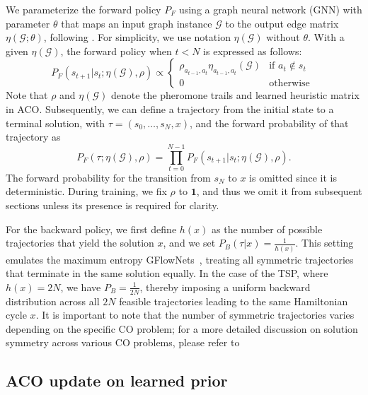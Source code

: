 \documentclass[twoside]{article}
\theoremstyle{plain}
\theoremstyle{definition}
\theoremstyle{remark}
\begin{document}
We parameterize the forward policy $P_F$ using a graph neural network (GNN) with parameter $\theta$ that maps an input graph instance $\mathcal{G}$ to the output edge matrix $\eta(\mathcal{G};\theta)$, following \citet{ye2023deepaco}. For simplicity, we use notation $\eta(\mathcal{G})$ without $\theta$. With a given $\eta(\mathcal{G})$, the forward policy when $t < N$ is expressed as follows:
\begin{equation} \label{eq:policy}
    P_F(s_{t+1}|s_t; \eta(\mathcal{G}), \rho)
    \propto \begin{cases} \rho_{a_{t-1},a_{t}}\eta_{a_{t-1},a_{t}}(\mathcal{G}) & \text{if $a_t \notin s_{t}$ }\\ 0 & \text{otherwise} \end{cases}
\end{equation}
Note that $\rho$ and $\eta(\mathcal{G})$ denote the pheromone trails and learned heuristic matrix in ACO. Subsequently, we can define a trajectory from the initial state to a terminal solution, with $\tau = (s_0, \ldots, s_N, x)$, and the forward probability of that trajectory as
\begin{equation} \label{eq:forward_traj}
    P_F(\tau;\eta(\mathcal{G}), \rho) = \prod_{t=0}^{N-1} P_F(s_{t+1}|s_t; \eta(\mathcal{G}), \rho).
\end{equation}
The forward probability for the transition from $s_N$ to $x$ is omitted since it is deterministic. During training, we fix $\rho$ to $\mathbf{1}$, and thus we omit it from subsequent sections unless its presence is required for clarity.


For the backward policy, we first define $h(x)$ as the number of possible trajectories that yield the solution $x$, and we set $P_B(\tau|x) = \frac{1}{h(x)}$. This setting emulates the maximum entropy GFlowNets~\citep{zhang2022generative}, treating all symmetric trajectories that terminate in the same solution equally. In the case of the TSP, where $h(x)=2N$, we have $P_B=\frac{1}{2N}$, thereby imposing a uniform backward distribution across all $2N$ feasible trajectories leading to the same Hamiltonian cycle $x$. It is important to note that the number of symmetric trajectories varies depending on the specific CO problem; for a more detailed discussion on solution symmetry across various CO problems, please refer to 



\subsection{ACO update on learned prior}
\end{document}
